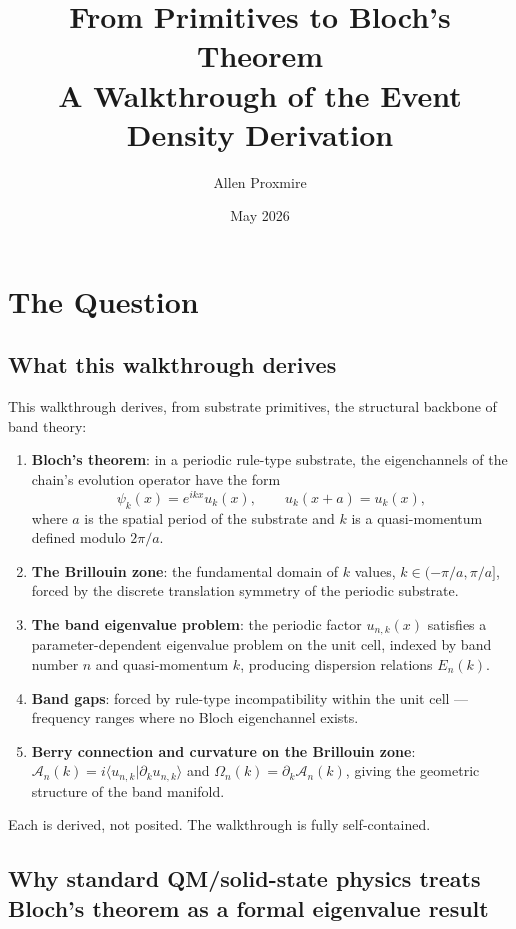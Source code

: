 \documentclass[11pt,a4paper]{article}
\title{\vspace{-1cm}\Large\bfseries From Primitives to Bloch's Theorem\\[6pt]
\large\mdseries A Walkthrough of the Event Density Derivation}
\author{Allen Proxmire}
\date{May 2026}
\begin{document}
\maketitle
\thispagestyle{empty}

\section{The Question}

\subsection*{What this walkthrough derives}

This walkthrough derives, from substrate primitives, the structural backbone of band theory:

\begin{enumerate}[noitemsep]
  \item \textbf{Bloch's theorem}: in a periodic rule-type substrate, the eigenchannels of the chain's evolution operator have the form
  \[
  \psi_k(x) = e^{ikx} u_k(x), \qquad u_k(x+a) = u_k(x),
  \]
  where $a$ is the spatial period of the substrate and $k$ is a quasi-momentum defined modulo $2\pi/a$.
  \item \textbf{The Brillouin zone}: the fundamental domain of $k$ values, $k \in (-\pi/a, \pi/a]$, forced by the discrete translation symmetry of the periodic substrate.
  \item \textbf{The band eigenvalue problem}: the periodic factor $u_{n,k}(x)$ satisfies a parameter-dependent eigenvalue problem on the unit cell, indexed by band number $n$ and quasi-momentum $k$, producing dispersion relations $E_n(k)$.
  \item \textbf{Band gaps}: forced by rule-type incompatibility within the unit cell --- frequency ranges where no Bloch eigenchannel exists.
  \item \textbf{Berry connection and curvature on the Brillouin zone}: $\mathcal{A}_n(k) = i\langle u_{n,k}|\partial_k u_{n,k}\rangle$ and $\Omega_n(k) = \partial_k \mathcal{A}_n(k)$, giving the geometric structure of the band manifold.
\end{enumerate}

Each is derived, not posited. The walkthrough is fully self-contained.

\subsection*{Why standard QM/solid-state physics treats Bloch's theorem as a formal eigenvalue result}
\end{document}

